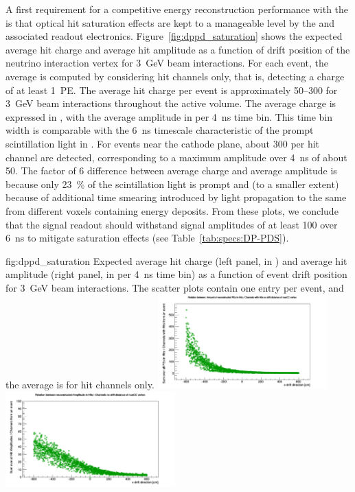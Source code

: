 A first requirement for a competitive energy reconstruction performance with the  is that optical hit saturation effects are kept to a manageable level by the  and associated readout electronics. Figure~\ref{fig:dppd_saturation} shows the expected average hit charge and average hit amplitude as a function of drift position of the neutrino interaction vertex for \SI{3}{\GeV} beam \nue {} interactions. For each event, the average is computed by considering hit  channels only, that is,  detecting a charge of at least \SI{1}{PE}. The average hit charge per event is approximately \SIrange{50}{300}{} for \SI{3}{\GeV} beam \nue {} interactions throughout the  active volume. The average charge is expressed in , with the average amplitude in  per \SI{4}{\nano\s} time bin. This time bin width is comparable with the \SI{6}{\nano\s} timescale characteristic of the prompt scintillation light in . For events near the cathode plane, about \SI{300}{} per hit channel are detected, corresponding to a maximum amplitude over \SI{4}{\nano\s} of about \SI{50}{}. The factor of 6 difference between average charge and average amplitude is because only \SI{23}{\%} of the scintillation light is prompt and (to a smaller extent) because of additional time smearing introduced by light propagation to the same  from different  voxels containing energy deposits. From these plots, we conclude that the  signal readout should withstand signal amplitudes of at least \SI{100}{} over \SI{6}{\nano\s} to mitigate saturation effects (see Table~\ref{tab:specs:DP-PDS}).

\begin{dunefigure}{fig:dppd_saturation}
{Expected average hit charge (left panel, in ) and average hit amplitude (right panel, in  per \SI{4}{\nano\s} time bin) as a function of event drift position for \SI{3}{\GeV} beam \nue {} interactions. The scatter plots  contain one entry per event, and the average is for hit  channels only.}
\includegraphics[trim={0cm 0cm 0cm 1.cm}, clip, width=0.49\textwidth]{graphics/dppd_avg_charge_per_channel.pdf} \hfill
\includegraphics[trim={0cm 0cm 0cm 1.cm}, clip, width=0.49\textwidth]{graphics/dppd_avg_amplitude_per_channel.pdf}
\end{dunefigure}


